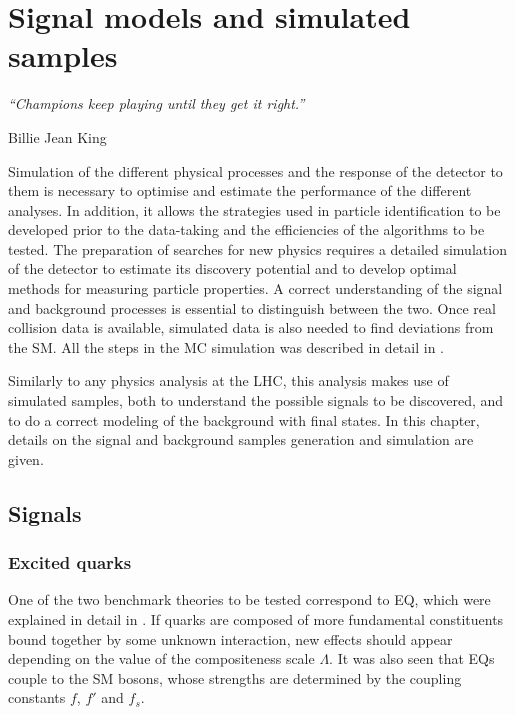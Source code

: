 \chapter{Signal models and simulated samples}
\label{ch:samples}
\epigraph{\emph{“Champions keep playing until they get it right.”}}{Billie Jean King}


Simulation of the different physical processes and the response of the detector to them is necessary to optimise and estimate the performance of the different analyses. In addition, it allows the strategies used in particle identification to be developed prior to the data-taking and the efficiencies of the algorithms to be tested. The preparation of searches for new physics requires a detailed simulation of the detector to estimate its discovery potential and to develop optimal methods for measuring particle properties. A correct understanding of the signal and background processes is essential to distinguish between the two. Once real collision data is available, simulated data is also needed to find deviations from the \ac{SM}. All the steps in the \ac{MC} simulation was described in detail in \Sect{\ref{sec:theory:mc_simulation}}.

Similarly to any physics analysis at the \ac{LHC}, this analysis makes use of simulated samples, both to understand the possible signals to be discovered, and to do a correct modeling of the background with \gammajet final states.
In this chapter, details on the signal and background samples generation and simulation are given.


\section{Signals}
\label{sec:samples:samples:sig}

\subsection{Excited quarks}
\label{subsec:samples:samples:sig:qstar}

One of the two benchmark theories to be tested correspond to \ac{EQ}, which were explained in detail in \Sect{\ref{subsec:theory:bsm:qstar}}. If quarks are composed of more fundamental constituents bound together by some unknown interaction, new effects should appear depending on the value of the compositeness scale \(\Lambda\).
It was also seen that \acp{EQ} couple to the \ac{SM} bosons, whose strengths are determined by the coupling constants \(f\), \(f'\) and \(f_s\).

